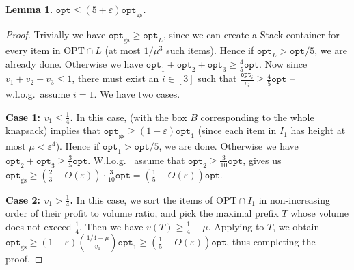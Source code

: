 \documentclass[10pt,a4paper]{amsart}
\newcommand{\kvnnew}[1]{\textcolor{black}{#1}}
\renewcommand{\epsilon}{\varepsilon} %
\newtheorem{lemma}[theorem]{Lemma}
\theoremstyle{definition}
\newcommand{\alg}{\mathtt{opt}_{\mathrm{gs}}}
\newcommand{\opt}{\mathtt{opt}}
\newcommand{\optgs}{\mathtt{opt}_{\mathrm{gs}}}
\begin{document}
\begin{lemma}
$\opt\le (5+\epsilon)\alg$.    
\end{lemma}
\begin{proof}
Trivially we have $\optgs \ge \opt_L$, since we can create a \kvnnew{Stack} container for every item in $\text{OPT}\cap L$ (at most $1/\mu^3$ such items). Hence if $\opt_L > \opt/5$, we are already done. Otherwise we have $\opt_1+\opt_2+\opt_3 \ge \frac{4}{5}\opt$. Now since $v_1 + v_2 + v_3 \le 1$, there must exist an $i \in [3]$ such that $\frac{\opt_i}{v_i} \ge \frac{4}{5}\opt$ -- w.l.o.g.~assume $i=1$. We have two cases.


\textbf{Case 1: $v_1 \le \frac{1}{4}$.} In this case,  (with the box $B$ corresponding to the whole knapsack) implies that $\optgs \ge (1-\epsilon)\opt_1$ (since each item in $I_1$ has height at most $\mu < \epsilon^4$). Hence if $\opt_1 > \opt/5$, we are done. Otherwise we have $\opt_2 + \opt_3 \ge \frac{3}{5}\opt$.  W.l.o.g.~ assume that $\opt_2 \ge \frac{3}{10}\opt$,  gives us $\optgs \ge \left(\frac{2}{3}-O(\epsilon)\right)\cdot \frac{3}{10}\opt = \left(\frac{1}{5}-O(\epsilon)\right)\opt$.


\textbf{Case 2: $v_1 > \frac{1}{4}$.} In this case, we sort the items of $\text{OPT}\cap I_1$ in non-increasing order of their profit to volume ratio, and pick the maximal prefix $T$ whose volume does not exceed $\frac{1}{4}$. Then we have $v(T) \ge \frac{1}{4}-\mu$. Applying  to $T$, we obtain
$\optgs \ge (1-\epsilon)\left(\frac{1/4-\mu}{v_1}\right)\opt_1 \ge \left(\frac{1}{5}-O(\epsilon)\right)\opt$,
thus completing the proof.
\end{proof}
\end{document}
